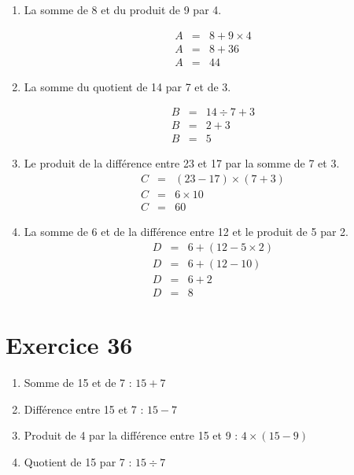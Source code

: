 \documentclass[12pt,a4paper]{extarticle}
\begin{document}
	\begin{enumerate}[label = \alph*.]
	\item La somme de 8 et du produit de 9 par 4.
	
	\begin{eqnarray*}
		A &=& 8 + 9 \times 4 \\
		A &=& 8 + 36 \\		
		A &=& 44
	\end{eqnarray*}


	\item La somme du quotient de 14 par 7 et de 3.
	
	\begin{eqnarray*}
		B &=& 14 \div 7 + 3 \\
		B &=& 2 + 3 \\		
		B &=& 5
	\end{eqnarray*}

	\item Le produit de la différence entre 23 et 17 par la somme de 7 et 3.
	\begin{eqnarray*}
		C &=& (23 - 17) \times (7 + 3) \\
		C &=& 6 \times 10 \\		
		C &=& 60
	\end{eqnarray*}
	
	\item La somme de 6 et de la différence entre 12 et le produit de 5 par 2.
	\begin{eqnarray*}
		D &=& 6 + (12 - 5 \times 2) \\
		D &=& 6 + (12 - 10) \\		
		D &=& 6 + 2 \\
		D &=& 8
	\end{eqnarray*}

\end{enumerate}


\section*{Exercice 36}

\begin{enumerate}[label = \alph*.]
	\item Somme de 15 et de 7 : $15 + 7$
	\item Différence entre 15 et 7 : $15 - 7$
	\item Produit de 4 par la différence entre 15 et 9 : $4 \times (15 - 9)$
	\item Quotient de 15 par 7 : $15 \div 7$
\end{enumerate}
\end{document}
